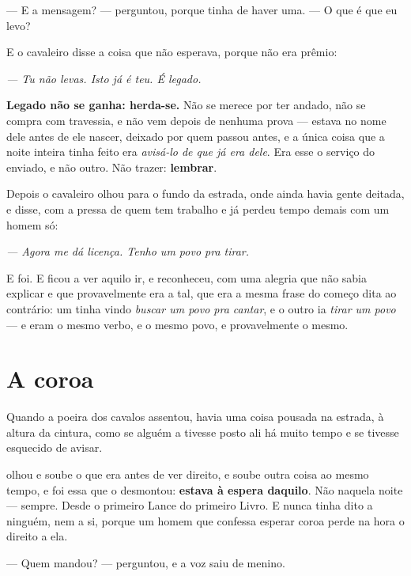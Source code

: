\documentclass[livro.tex]{subfiles}
\begin{document}
\medskip
\noindent --- E a mensagem? --- perguntou, porque tinha de haver uma. --- O que
é que eu levo?

\medskip
\noindent E o cavaleiro disse a coisa que \Ben não esperava, porque não era
prêmio:

\begin{center}
\emph{--- Tu não levas. Isto já é teu. É legado.}
\end{center}

\medskip
\noindent \textbf{Legado não se ganha: herda-se.} Não se merece por ter andado,
não se compra com travessia, e não vem depois de nenhuma prova --- estava no
nome dele antes de ele nascer, deixado por quem passou antes, e a única coisa
que a noite inteira tinha feito era \emph{avisá-lo de que já era dele}. Era
esse o serviço do enviado, e não outro. Não trazer: \textbf{lembrar}.

\medskip
\noindent Depois o cavaleiro olhou para o fundo da estrada, onde ainda havia
gente deitada, e disse, com a pressa de quem tem trabalho e já perdeu tempo
demais com um homem só:

\begin{center}
\emph{--- Agora me dá licença. Tenho um povo pra tirar.}
\end{center}

\medskip
\noindent E foi. E \Ben ficou a ver aquilo ir, e reconheceu, com uma alegria
que não sabia explicar e que provavelmente era a tal, que era a mesma frase do
começo dita ao contrário: um tinha vindo \emph{buscar um povo pra cantar}, e o
outro ia \emph{tirar um povo} --- e eram o mesmo verbo, e o mesmo povo, e
provavelmente o mesmo.

\chapter{A coroa}

Quando a poeira dos cavalos assentou, havia uma coisa pousada na estrada, à
altura da cintura, como se alguém a tivesse posto ali há muito tempo e se
tivesse esquecido de avisar.

\Ben olhou e soube o que era antes de ver direito, e soube outra coisa ao
mesmo tempo, e foi essa que o desmontou: \textbf{estava à espera daquilo}. Não
naquela noite --- sempre. Desde o primeiro Lance do primeiro Livro. E nunca
tinha dito a ninguém, nem a si, porque um homem que confessa esperar coroa
perde na hora o direito a ela.

\medskip
\noindent --- Quem mandou? --- perguntou, e a voz saiu de menino.
\end{document}
